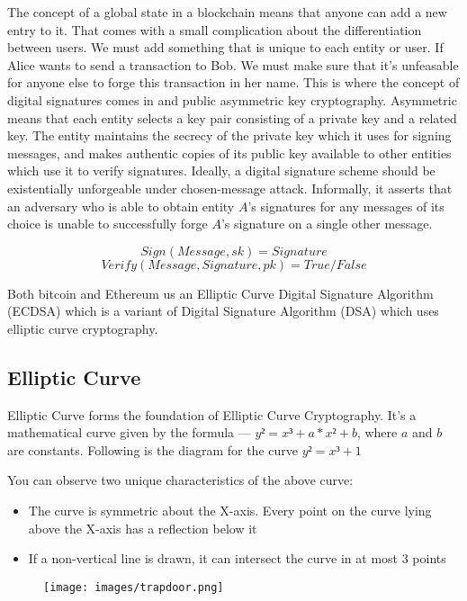 \documentclass{article}
\begin{document}
The concept of a global state in a blockchain means that anyone can add a new entry to it. That comes with a small complication about the differentiation between users.
We must add something that is unique to each entity or user. If Alice wants to send a transaction to Bob. We must make sure that it's unfeasable for anyone else to forge this transaction in her name. This is where the concept of digital signatures comes in and public asymmetric key cryptography. Asymmetric means that each entity selects a key pair consisting of a private key and a related key. The entity maintains the secrecy of the private key which it uses for signing messages, and makes authentic copies of its public key available to other entities which use it to verify signatures. Ideally, a digital signature scheme should be existentially unforgeable under chosen-message attack. Informally, it asserts that an adversary who is able to obtain entity $A$'s signatures for any messages of its choice is unable to successfully forge $A$'s signature on a single other message.

\[ Sign(Message, sk) = Signature  \]
\[ Verify(Message, Signature, pk) = True / False  \]

Both bitcoin and Ethereum us an  Elliptic Curve Digital Signature Algorithm (ECDSA) which is a variant of Digital Signature Algorithm (DSA) which uses elliptic curve cryptography.



\subsection{Elliptic Curve}

Elliptic Curve forms the foundation of Elliptic Curve Cryptography. It’s a mathematical curve given by the formula — $y² = x³ + a*x² + b$, where $a$ and $b$ are constants. Following is the diagram for the curve $y² = x³ + 1$ \newline


You can observe two unique characteristics of the above curve:

\begin{itemize}
  \item The curve is symmetric about the X-axis. Every point on the curve lying above the X-axis has a reflection below it
  \item If a non-vertical line is drawn, it can intersect the curve in at most 3 points
\end{itemize}


\begin{figure}[hbt!]
 \centering
\texttt{[image: images/trapdoor.png]}
\end{figure}
\end{document}
